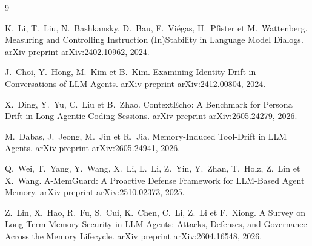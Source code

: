 \documentclass[11pt]{article}
\begin{document}
\begin{thebibliography}{9}
\footnotesize

K.~Li, T.~Liu, N.~Bashkansky, D.~Bau, F.~Vi\'egas, H.~Pfister et M.~Wattenberg.
\newblock Measuring and Controlling Instruction (In)Stability in Language Model
Dialogs.
\newblock arXiv preprint arXiv:2402.10962, 2024.

J.~Choi, Y.~Hong, M.~Kim et B.~Kim.
\newblock Examining Identity Drift in Conversations of LLM Agents.
\newblock arXiv preprint arXiv:2412.00804, 2024.

X.~Ding, Y.~Yu, C.~Liu et B.~Zhao.
\newblock ContextEcho: A Benchmark for Persona Drift in Long Agentic-Coding Sessions.
\newblock arXiv preprint arXiv:2605.24279, 2026.

M.~Dabas, J.~Jeong, M.~Jin et R.~Jia.
\newblock Memory-Induced Tool-Drift in LLM Agents.
\newblock arXiv preprint arXiv:2605.24941, 2026.

Q.~Wei, T.~Yang, Y.~Wang, X.~Li, L.~Li, Z.~Yin, Y.~Zhan, T.~Holz, Z.~Lin et
X.~Wang.
\newblock A-MemGuard: A Proactive Defense Framework for LLM-Based Agent Memory.
\newblock arXiv preprint arXiv:2510.02373, 2025.

Z.~Lin, X.~Hao, R.~Fu, S.~Cui, K.~Chen, C.~Li, Z.~Li et F.~Xiong.
\newblock A Survey on Long-Term Memory Security in LLM Agents: Attacks, Defenses, and
Governance Across the Memory Lifecycle.
\newblock arXiv preprint arXiv:2604.16548, 2026.

\end{thebibliography}
\end{document}
